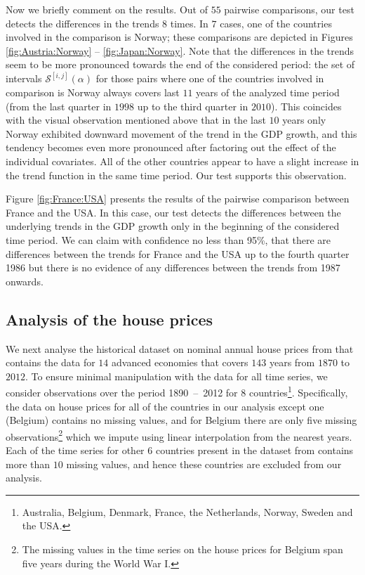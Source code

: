 \documentclass[a4paper,12pt]{article}
\begin{document}
Now we briefly comment on the results. Out of $55$ pairwise comparisons, our test detects the differences in the trends $8$ times. In $7$ cases, one of the countries involved in the comparison is Norway; these comparisons are depicted in Figures \ref{fig:Austria:Norway} -- \ref{fig:Japan:Norway}. Note that the differences in the trends seem to be more pronounced towards the end of the considered period: the set of intervals $\mathcal{S}^{[i, j]}(\alpha)$ for those pairs where one of the countries involved in comparison is Norway always covers last $11$ years of the analyzed time period (from the last quarter in $1998$ up to the third quarter in $2010$). This coincides with the visual observation mentioned above that in the last $10$ years only Norway exhibited downward movement of the trend in the GDP growth, and this tendency becomes even more pronounced after factoring out the effect of the individual covariates. All of the other countries appear to have a slight increase in the trend function in the same time period. Our test supports this observation.

Figure \ref{fig:France:USA} presents the results of the pairwise comparison between France and the USA. In this case, our test detects the differences between the underlying trends in the GDP growth only in the beginning of the considered time period. We can claim with confidence no less than 95\%, that there are differences between the trends for France and the USA up to the fourth quarter 1986 but there is no evidence of any differences between the trends from 1987 onwards.

\newpage
\subsection{Analysis of the house prices}\label{subsec:app:house}
We next analyse the historical dataset on nominal annual house prices from \linebreak\cite{Knoll2017} that contains the data for $14$ advanced economies that covers $143$ years from $1870$ to $2012$.  To ensure minimal manipulation with the data for all time series, we consider observations over the period 1890~--~2012 for 8 countries\footnote{Australia, Belgium, Denmark, France, the Netherlands, Norway, Sweden and the USA.}. Specifically, the data on house prices for all of the countries in our analysis except one (Belgium) contains no missing values, and for Belgium there are only five missing observations\footnote{The missing values in the time series on the house prices for Belgium span five years during the World War I.} which we impute using linear interpolation from the nearest years. Each of the time series for other $6$ countries present in the dataset from \cite{Knoll2017} contains more than $10$ missing values, and hence these countries are excluded from our analysis.
\end{document}
